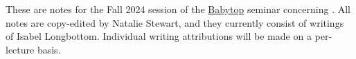 \documentclass[10pt]{amsart}
\begin{document}
\maketitle

These are notes for the Fall 2024 session of the \href{https://math.mit.edu/topology/babytop/index.html}{Babytop} seminar concerning \cite{HHR}.
All notes are copy-edited by Natalie Stewart, and they currently consist of writings of Isabel Longbottom. 
Individual writing attributions will be made on a per-lecture basis. 

\toc

\newpage

  
\printbibliography
\end{document}
